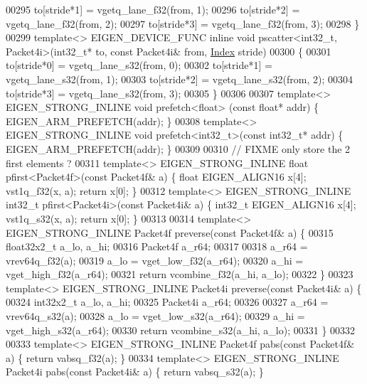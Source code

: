 \begin{DoxyCode}
{{00295   to[stride*1] = vgetq\_lane\_f32(from, 1);
00296   to[stride*2] = vgetq\_lane\_f32(from, 2);
00297   to[stride*3] = vgetq\_lane\_f32(from, 3);
00298 \}
00299 \textcolor{keyword}{template}<> EIGEN\_DEVICE\_FUNC \textcolor{keyword}{inline} \textcolor{keywordtype}{void} pscatter<int32\_t, Packet4i>(int32\_t* to, \textcolor{keyword}{const} Packet4i& from, 
      \hyperlink{namespace_eigen_a62e77e0933482dafde8fe197d9a2cfde}{Index} stride)
00300 \{
00301   to[stride*0] = vgetq\_lane\_s32(from, 0);
00302   to[stride*1] = vgetq\_lane\_s32(from, 1);
00303   to[stride*2] = vgetq\_lane\_s32(from, 2);
00304   to[stride*3] = vgetq\_lane\_s32(from, 3);
00305 \}
00306 
00307 \textcolor{keyword}{template}<> EIGEN\_STRONG\_INLINE \textcolor{keywordtype}{void} prefetch<float>  (\textcolor{keyword}{const} \textcolor{keywordtype}{float}*    addr) \{ EIGEN\_ARM\_PREFETCH(addr); \}
00308 \textcolor{keyword}{template}<> EIGEN\_STRONG\_INLINE \textcolor{keywordtype}{void} prefetch<int32\_t>(\textcolor{keyword}{const} int32\_t*  addr) \{ EIGEN\_ARM\_PREFETCH(addr); \}
00309 
00310 \textcolor{comment}{// FIXME only store the 2 first elements ?}
00311 \textcolor{keyword}{template}<> EIGEN\_STRONG\_INLINE \textcolor{keywordtype}{float}   pfirst<Packet4f>(\textcolor{keyword}{const} Packet4f& a) \{ \textcolor{keywordtype}{float}   EIGEN\_ALIGN16 x[4]; 
      vst1q\_f32(x, a); \textcolor{keywordflow}{return} x[0]; \}
00312 \textcolor{keyword}{template}<> EIGEN\_STRONG\_INLINE int32\_t pfirst<Packet4i>(\textcolor{keyword}{const} Packet4i& a) \{ int32\_t EIGEN\_ALIGN16 x[4]; 
      vst1q\_s32(x, a); \textcolor{keywordflow}{return} x[0]; \}
00313 
00314 \textcolor{keyword}{template}<> EIGEN\_STRONG\_INLINE Packet4f preverse(\textcolor{keyword}{const} Packet4f& a) \{
00315   float32x2\_t a\_lo, a\_hi;
00316   Packet4f a\_r64;
00317 
00318   a\_r64 = vrev64q\_f32(a);
00319   a\_lo = vget\_low\_f32(a\_r64);
00320   a\_hi = vget\_high\_f32(a\_r64);
00321   \textcolor{keywordflow}{return} vcombine\_f32(a\_hi, a\_lo);
00322 \}
00323 \textcolor{keyword}{template}<> EIGEN\_STRONG\_INLINE Packet4i preverse(\textcolor{keyword}{const} Packet4i& a) \{
00324   int32x2\_t a\_lo, a\_hi;
00325   Packet4i a\_r64;
00326 
00327   a\_r64 = vrev64q\_s32(a);
00328   a\_lo = vget\_low\_s32(a\_r64);
00329   a\_hi = vget\_high\_s32(a\_r64);
00330   \textcolor{keywordflow}{return} vcombine\_s32(a\_hi, a\_lo);
00331 \}
00332 
00333 \textcolor{keyword}{template}<> EIGEN\_STRONG\_INLINE Packet4f pabs(\textcolor{keyword}{const} Packet4f& a) \{ \textcolor{keywordflow}{return} vabsq\_f32(a); \}
00334 \textcolor{keyword}{template}<> EIGEN\_STRONG\_INLINE Packet4i pabs(\textcolor{keyword}{const} Packet4i& a) \{ \textcolor{keywordflow}{return} vabsq\_s32(a); \}
}}
\end{DoxyCode}
